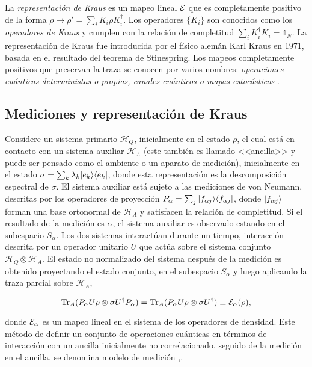  La \textit{representación de Kraus} es un mapeo lineal $\mathcal{E}$ que es completamente positivo de la forma $\rho \mapsto \rho'=\sum_i K_i\rho K_i^\dagger$. Los operadores $\{K_i\}$ son conocidos como los \textit{operadores de Kraus} y cumplen con la relación de completitud $\sum_i K_i^\dagger K_i=\mathds{1}_N$. La representación de Kraus fue introducida por el físico alemán Karl Kraus en 1971, basada en el resultado del teorema de Stinespring. Los mapeos completamente positivos que preservan la traza se conocen por varios nombres: \textit{operaciones cuánticas deterministas o propias, canales cuánticos o mapas estocásticos} {\cite{2007geometry}}.

\subsection{Mediciones y representación de Kraus}\label{Medicion_RepresentacionDeKraus} %

Considere un sistema primario $\mathcal{H}_Q$, inicialmente en el estado $\rho$,  el cual está en contacto con un sistema auxiliar $\mathcal{H}_A$ (este también es llamado <<ancilla>> y puede ser pensado como el ambiente o un aparato de medición), inicialmente en el estado $\sigma=\sum_k \lambda_k |e_k\rangle \langle e_k|$, donde esta representación es la descomposición espectral de $\sigma$. El sistema auxiliar está sujeto a las mediciones de von Neumann, descritas por los operadores de proyección $P_\alpha=\sum_j |f_{\alpha j}\rangle \langle f_{\alpha j}|$,  donde $|f_{\alpha j}\rangle$ forman una base ortonormal de $\mathcal{H}_A$ y satisfacen la relación de completitud. Si el resultado de la medición es $\alpha$, el sistema auxiliar es observado estando en el subespacio $S_\alpha$. Los dos sistemas interactúan durante un tiempo, interacción descrita por un operador unitario $U$ que actúa sobre el sistema conjunto $\mathcal{H}_Q\otimes \mathcal{H}_A$. El estado no normalizado del sistema después de la medición es obtenido proyectando el estado conjunto, en el subespacio $S_\alpha$ y luego aplicando la traza parcial sobre $\mathcal{H}_A$,

\begin{equation}\label{measurement_model}
    {\rm Tr}_A(P_\alpha U \rho \otimes \sigma U^\dagger P_\alpha)= {\rm Tr}_A(P_\alpha U \rho \otimes \sigma U^\dagger)\equiv \mathcal{E}_\alpha(\rho),
\end{equation}


donde $\mathcal{E}_\alpha$ es un mapeo lineal en el sistema de los operadores de densidad. Este método de definir un conjunto de operaciones cuánticas en términos de interacción con un ancilla inicialmente no correlacionado, seguido de la medición en el ancilla, se denomina modelo de medición {\cite{unm2014},\cite{nielsen_chuang_2010}}.

